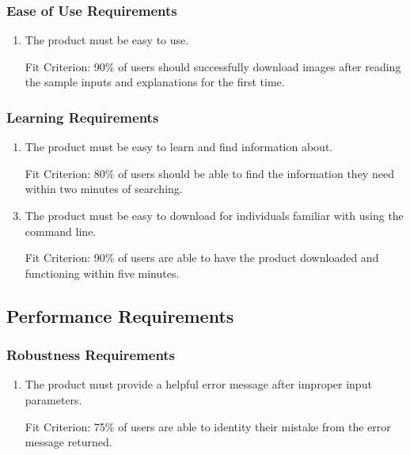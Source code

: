 \documentclass[12pt, titlepage]{article}
\begin{document}
\subsubsection{Ease of Use Requirements}

\begin{enumerate}[label=EUR\arabic*:, wide=0pt, leftmargin=*]
    \item The product must be easy to use.
    \item [Fit Criterion:] 90\% of users should successfully download images after reading the sample inputs and explanations for the first time.
\end{enumerate}

\subsubsection{Learning Requirements}
\begin{enumerate}[label=LR\arabic*:, wide=0pt, leftmargin=*]
    \item The product must be easy to learn and find information about.
    \item [Fit Criterion:] 80\% of users should be able to find the information they need within two minutes of searching.
    \\
    \item The product must be easy to download for individuals familiar with using the command line.
    \item [Fit Criterion:] 90\% of users are able to have the product downloaded and functioning within five minutes.
\end{enumerate}

\subsection{Performance Requirements}

\subsubsection{Robustness Requirements}
\begin{enumerate}[label=RR\arabic*:, wide=0pt, leftmargin=*]
    \item The product must provide a helpful error message after improper input parameters.
    \item [Fit Criterion:] 75\% of users are able to identity their mistake from the error message returned.
\end{enumerate}
\end{document}
